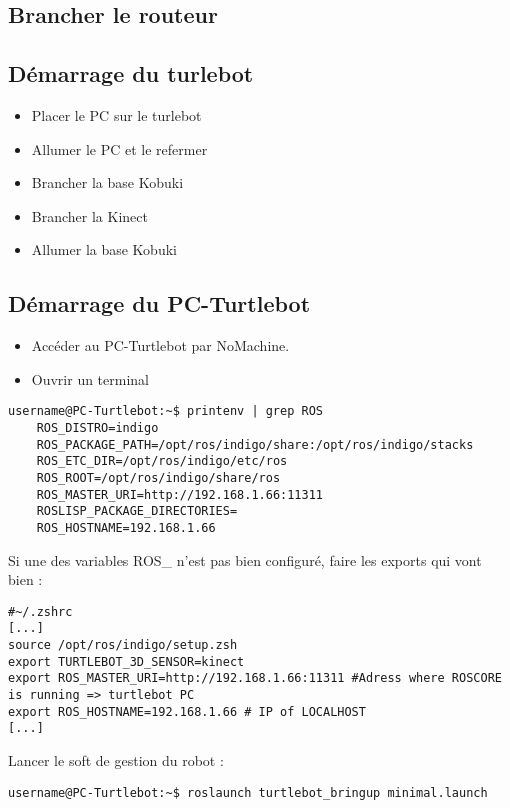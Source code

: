 \documentclass[11pt, a4paper,notitlepage]{article}
\begin{document}
\subsection{Brancher le routeur}
\subsection{Démarrage du turlebot}
\begin{itemize}
  \item Placer le PC sur le turlebot
  \item Allumer le PC et le refermer
  \item Brancher la base Kobuki
  \item Brancher la Kinect
  \item Allumer la base Kobuki
\end{itemize}

\subsection{Démarrage du PC-Turtlebot}
\begin{itemize}
  \item Accéder au PC-Turtlebot par NoMachine.
  \item Ouvrir un terminal
\end{itemize}

\begin{lstlisting}[style=Bash]
  username@PC-Turtlebot:~$ printenv | grep ROS
    ROS_DISTRO=indigo
    ROS_PACKAGE_PATH=/opt/ros/indigo/share:/opt/ros/indigo/stacks
    ROS_ETC_DIR=/opt/ros/indigo/etc/ros
    ROS_ROOT=/opt/ros/indigo/share/ros
    ROS_MASTER_URI=http://192.168.1.66:11311
    ROSLISP_PACKAGE_DIRECTORIES=
    ROS_HOSTNAME=192.168.1.66
\end{lstlisting}

Si une des variables ROS\_ n'est pas bien configuré, faire les exports qui vont bien :
\begin{lstlisting}[style=Bash]
#~/.zshrc
[...]
source /opt/ros/indigo/setup.zsh
export TURTLEBOT_3D_SENSOR=kinect
export ROS_MASTER_URI=http://192.168.1.66:11311 #Adress where ROSCORE is running => turtlebot PC
export ROS_HOSTNAME=192.168.1.66 # IP of LOCALHOST
[...]
\end{lstlisting}
Lancer le soft de gestion du robot :
\begin{lstlisting}[style=Bash]
  username@PC-Turtlebot:~$ roslaunch turtlebot_bringup minimal.launch
\end{lstlisting}
\end{document}
